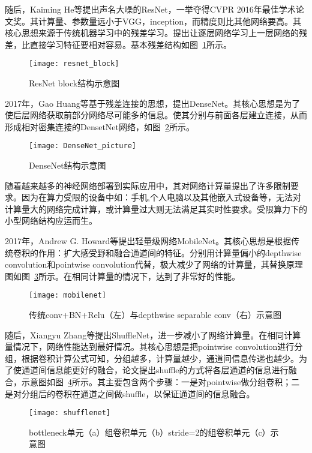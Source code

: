 随后，Kaiming He等提出声名大噪的ResNet，一举夺得CVPR 2016年最佳学术论文奖。其计算量、参数量远小于VGG，inception，而精度则比其他网络要高。其核心思想来源于传统机器学习中的残差学习。提出让逐层网络学习上一层网络的残差，比直接学习特征要相对容易。基本残差结构如图~\ref{fig:resnet_block}所示。

\begin{figure}[htp]
\centering
\texttt{[image: resnet\_block]}
\caption{ResNet block结构示意图}
\label{fig:resnet_block}
\end{figure}
2017年，Gao Huang等基于残差连接的思想，提出DenseNet。其核心思想是为了使后层网络获取前部分网络尽可能多的信息。使其分别与前面各层建立连接，从而形成相对密集连接的DensetNet网络，如图~\ref{fig:DenseNet_picture}所示。

\begin{figure}[htp]
\centering
\texttt{[image: DenseNet\_picture]}
\caption{DenseNet结构示意图}
\label{fig:DenseNet_picture}
\end{figure}
随着越来越多的神经网络部署到实际应用中，其对网络计算量提出了许多限制要求。因为在算力受限的设备中如：手机,个人电脑以及其他嵌入式设备等，无法对计算量大的网络完成计算，或计算量过大则无法满足其实时性要求。受限算力下的小型网络结构应运而生。

2017年，Andrew G. Howard等提出轻量级网络MobileNet。其核心思想是根据传统卷积的作用：扩大感受野和融合通道间的特征。分别用计算量偏小的depthwise convolution和pointwise convolution代替，极大减少了网络的计算量，其替换原理图如图~\ref{fig:mobilenet}所示。在相同计算量的情况下，达到了非常好的性能。

\begin{figure}[htp]
\centering
\texttt{[image: mobilenet]}
\caption{传统conv+BN+Relu（左）与depthwise separable conv（右）示意图}
\label{fig:mobilenet}
\end{figure}
随后，Xiangyu Zhang等提出ShuffleNet，进一步减小了网络计算量。在相同计算量情况下，网络性能达到最好情况。其核心思想是把pointwise convolution进行分组，根据卷积计算公式可知，分组越多，计算量越少，通道间信息传递也越少。为了使通道间信息能更好的融合，论文提出shuffle的方式将各层通道的信息进行融合，示意图如图~\ref{fig:shufflenet}所示。其主要包含两个步骤：一是对pointwise做分组卷积；二是对分组后的卷积在通道之间做shuffle，以保证通道间的信息融合。

\begin{figure}[htp]
\centering
\texttt{[image: shufflenet]}
\caption{bottleneck单元（a）组卷积单元（b）stride=2的组卷积单元（c）示意图}
\label{fig:shufflenet}
\end{figure}
